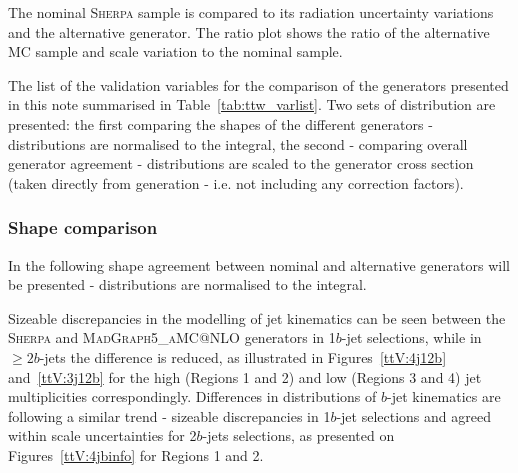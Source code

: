 The nominal  \textsc{Sherpa} \ttW  sample is compared to its radiation uncertainty variations and the alternative generator.
The ratio plot shows the ratio of the alternative MC sample and scale variation to the nominal sample.

The list of the validation variables for the comparison of the \ttW generators presented in this note summarised in Table~\ref{tab:ttw_varlist}.
Two sets of distribution are presented: the first comparing the shapes of the different generators - distributions are normalised to the integral, the second - comparing overall generator agreement - distributions are scaled to the generator cross section (taken directly from generation - i.e. not including any correction factors).

\subsubsection{Shape comparison}
\label{sec:ttw_shape}
In the following shape agreement between nominal and alternative generators will be presented - distributions are normalised to the integral.

Sizeable discrepancies in the modelling of jet kinematics can be seen between the \textsc{Sherpa} \ttW and \textsc{MadGraph5\_aMC@NLO} generators in 1$b$-jet selections, while in $\geq2b$-jets the difference is reduced, as illustrated in Figures~\ref{ttV:4j12b} and~\ref{ttV:3j12b} for the high (Regions 1 and 2) and low (Regions 3 and 4) jet multiplicities correspondingly. 
Differences in distributions of $b$-jet kinematics are following a similar trend - sizeable discrepancies in 1$b$-jet selections and agreed within scale uncertainties for 2$b$-jets selections, as presented on Figures~\ref{ttV:4jbinfo} for Regions 1 and 2.


